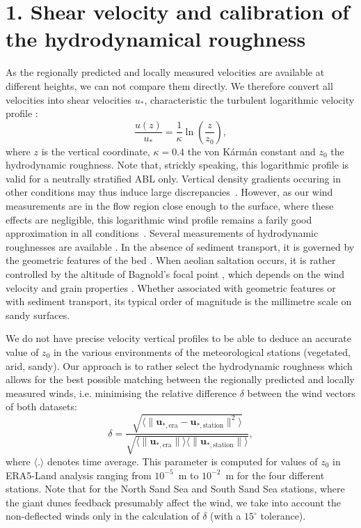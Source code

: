\section*{1. Shear velocity and calibration of the hydrodynamical roughness}
\label{calib_z0}

As the regionally predicted and locally measured velocities are available at different heights, we can not compare them directly. We therefore convert all velocities into shear velocities $u_{*}$, characteristic the turbulent logarithmic velocity profile \citep{Spalding1961, Stull1988}:
%
\begin{equation}
\frac{u(z)}{u_{*}} = \frac{1}{\kappa}\ln\left(\frac{z}{z_{0}}\right),
\end{equation}
%
where $z$ is the vertical coordinate, $\kappa = 0.4$ the von K\'arm\'an constant and $z_{0}$ the hydrodynamic roughness. Note that, strickly speaking, this logarithmic profile is valid for a neutrally stratified ABL only. Vertical density gradients occuring in other conditions may thus induce large discrepancies~\citep{Monin1954, Garratt1994, Dyer1974}. However, as our wind measurements are in the flow region close enough to the surface, where these effects are negligible, this logarithmic wind profile remains a farily good approximation in all conditions~\citep{gunn2021}.
%
Several measurements of hydrodynamic roughnesses are available \citep{Raupach1992,Bauer1992,Brown2008,Nield2014}. In the absence of sediment transport, it is governed by the geometric features of the bed \citep{Flack2010,Pelletier2016}. When aeolian saltation occurs, it is rather controlled by the altitude of Bagnold's focal point \citep{Duran2011,Valance2015}, which depends on the wind velocity and grain properties \citep{Sherman2008, Zhang2016, Field2018}. Whether associated with geometric features or with sediment transport, its typical order of magnitude is the millimetre scale on sandy surfaces.

We do not have precise velocity vertical profiles to be able to deduce an accurate value of $z_0$ in the various environments of the meteorological stations (vegetated, arid, sandy). Our approach is to rather select the hydrodynamic roughness which allows for the best possible matching between the regionally predicted and locally measured winds, i.e. minimising the relative difference $\delta$ between the wind vectors of both datasets:
%
\begin{equation}
\label{metric_roughness}
\delta = \frac{\sqrt{\langle\| \boldsymbol{u}_{*, \textrm{era}} - \boldsymbol{u}_{*, \textrm{station}} \|^{2}\rangle}}{\sqrt{ \langle \| \boldsymbol{u}_{*, \textrm{era}} \| \rangle \langle \| \boldsymbol{u}_{*, \textrm{station}} \| \rangle}} ,
\end{equation}
%
where $\langle.\rangle$ denotes time average. This parameter is computed for values of $z_0$ in ERA5-Land analysis ranging from $10^{-5}$~m to $10^{-2}$~m for the four different stations. Note that for the North Sand Sea and South Sand Sea stations, where the giant dunes feedback presumably affect the wind, we take into account the non-deflected winds only in the calculation of $\delta$ (with a $15^\circ$ tolerance).

